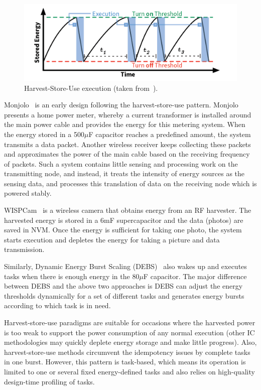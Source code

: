 \begin{figure}
    \centering
    \includegraphics[width=\columnwidth]{ch2_review/figures/saveanduse}
    \caption{Harvest-Store-Use execution (taken from~\cite{hester2017new}).}
    \label{Figure:saveanduse}
\end{figure}

Monjolo~\cite{debruin2013monjolo} is an early design following the harvest-store-use pattern. Monjolo presents a home power meter, whereby a current transformer is installed around the main power cable and provides the energy for this metering system. When the energy stored in a 500$\mu$F capacitor reaches a predefined amount, the system transmits a data packet. Another wireless receiver keeps collecting these packets and approximates the power of the main cable based on the receiving frequency of packets. Such a system contains little sensing and processing work on the transmitting node, and instead, it treats the intensity of energy sources as the sensing data, and processes this translation of data on the receiving node which is powered stably.

WISPCam~\cite{naderiparizi2015wispcam} is a wireless camera that obtains energy from an RF harvester. The harvested energy is stored in a 6mF supercapacitor and the data (photos) are saved in NVM. Once the energy is sufficient for taking one photo, the system starts execution and depletes the energy for taking a picture and data transmission. 

Similarly, Dynamic Energy Burst Scaling (DEBS)~\cite{gomez2016dynamic} also wakes up and executes tasks when there is enough energy in the 80$\mu$F capacitor. The major difference between DEBS and the above two approaches is DEBS can adjust the energy thresholds dynamically for a set of different tasks and generates energy bursts according to which task is in need.

Harvest-store-use paradigms are suitable for occasions where the harvested power is too weak to support the power consumption of any normal execution (other IC methodologies may quickly deplete energy storage and make little progress). Also, harvest-store-use methods circumvent the idempotency issues by complete tasks in one burst. However, this pattern is task-based, which means its operation is limited to one or several fixed energy-defined tasks and also relies on high-quality design-time profiling of tasks.

